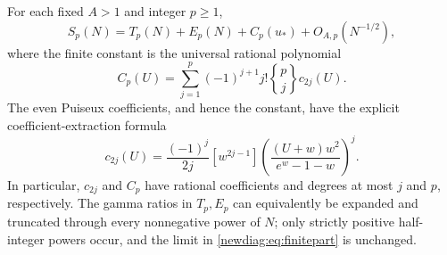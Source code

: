 \begin{theorem}
\label{newdiag:thm:finiteparts}
For each fixed $A>1$ and integer $p\geq1$,
\begin{equation}\label{newdiag:eq:finitepart}
 S_p(N)=T_p(N)+E_p(N)+C_p(u_*)+O_{A,p}(N^{-1/2}),
\end{equation}
where the finite constant is the universal rational polynomial
\begin{equation}\label{newdiag:eq:Cp}
 C_p(U)=\sum_{j=1}^p(-1)^{j+1}j!
                 \genfrac{\{}{\}}{0pt}{}{p}{j}c_{2j}(U).
\end{equation}
The even Puiseux coefficients, and hence the constant, have the
explicit coefficient-extraction formula
\begin{equation}\label{newdiag:eq:even-coefficients}
 c_{2j}(U)=\frac{(-1)^j}{2j}[w^{2j-1}]
       \left(\frac{(U+w)w^2}{e^w-1-w}\right)^j.
\end{equation}
In particular, $c_{2j}$ and $C_p$ have rational coefficients and
degrees at most $j$ and $p$, respectively.  The gamma ratios in
$T_p,E_p$ can equivalently be expanded and truncated through every
nonnegative power of $N$; only strictly positive half-integer powers
occur, and the limit in \eqref{newdiag:eq:finitepart} is unchanged.
\end{theorem}

